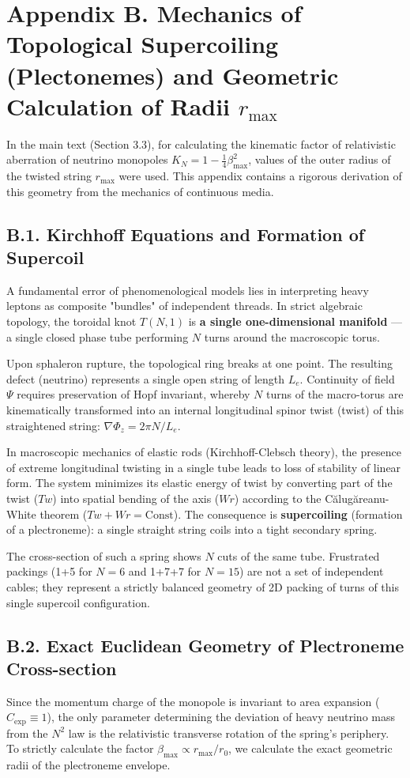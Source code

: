 \documentclass[11pt,a4paper]{article}
\begin{document}
\section*{Appendix B. Mechanics of Topological Supercoiling (Plectonemes) and Geometric Calculation of Radii $r_{\text{max}}$}
	
	In the main text (Section 3.3), for calculating the kinematic factor of relativistic aberration of neutrino monopoles $K_N = 1 - \frac{1}{4}\beta_{\text{max}}^2$, values of the outer radius of the twisted string $r_{\text{max}}$ were used. This appendix contains a rigorous derivation of this geometry from the mechanics of continuous media.
	
\subsection*{B.1. Kirchhoff Equations and Formation of Supercoil}
	A fundamental error of phenomenological models lies in interpreting heavy leptons as composite "bundles" of independent threads. In strict algebraic topology, the toroidal knot $T(N,1)$ is \textbf{a single one-dimensional manifold} — a single closed phase tube performing $N$ turns around the macroscopic torus.
	
	Upon sphaleron rupture, the topological ring breaks at one point. The resulting defect (neutrino) represents a single open string of length $L_e$. Continuity of field $\Psi$ requires preservation of Hopf invariant, whereby $N$ turns of the macro-torus are kinematically transformed into an internal longitudinal spinor twist (twist) of this straightened string: $\nabla \Phi_z = 2\pi N / L_e$.
	
	In macroscopic mechanics of elastic rods (Kirchhoff-Clebsch theory), the presence of extreme longitudinal twisting in a single tube leads to loss of stability of linear form. The system minimizes its elastic energy of twist by converting part of the twist ($Tw$) into spatial bending of the axis ($Wr$) according to the Călugăreanu-White theorem ($Tw + Wr = \text{Const}$).
	The consequence is \textbf{supercoiling} (formation of a plectroneme): a single straight string coils into a tight secondary spring. 
	
	The cross-section of such a spring shows $N$ cuts of the same tube. Frustrated packings (1+5 for $N=6$ and 1+7+7 for $N=15$) are not a set of independent cables; they represent a strictly balanced geometry of 2D packing of turns of this single supercoil configuration.
	
\subsection*{B.2. Exact Euclidean Geometry of Plectroneme Cross-section}
	Since the momentum charge of the monopole is invariant to area expansion ($C_{\text{exp}} \equiv 1$), the only parameter determining the deviation of heavy neutrino mass from the $N^2$ law is the relativistic transverse rotation of the spring's periphery. To strictly calculate the factor $\beta_{\text{max}} \propto r_{\text{max}}/r_0$, we calculate the exact geometric radii of the plectroneme envelope.
	
\end{document}
